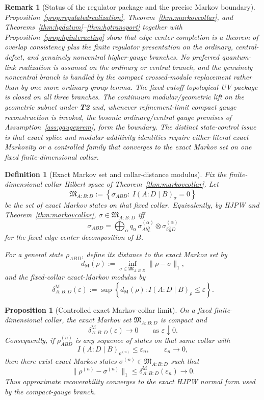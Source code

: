 \documentclass[11pt]{article}
\newtheorem{proposition}[theorem]{Proposition}
\newtheorem{definition}[theorem]{Definition}
\newtheorem{remark}[theorem]{Remark}
\begin{document}
\begin{remark}[Status of the regulator package and the precise Markov boundary]
Proposition~\ref{prop:regulatedrealization}, Theorem~\ref{thm:markovcollar}, and Theorems~\ref{thm:hgdatum}--\ref{thm:hgtransport} together with Proposition~\ref{prop:hginteracting} show that edge-center completion is a theorem of overlap consistency plus the finite regulator presentation on the ordinary, central-defect, and genuinely noncentral higher-gauge branches. No preferred quantum-link realization is assumed on the ordinary or central branch, and the genuinely noncentral branch is handled by the compact crossed-module replacement rather than by one more ordinary-group lemma. The fixed-cutoff topological UV package is closed on all three branches. The continuum modular/geometric lift on the geometric subnet under \textbf{T2} and, whenever refinement-limit compact gauge reconstruction is invoked, the bosonic ordinary/central gauge premises of Assumption~\ref{ass:gaugeprem}, form the boundary. The distinct state-control issue is that exact splice and modular-additivity identities require either literal exact Markovity or a controlled family that converges to the exact Markov set on one fixed finite-dimensional collar.
\end{remark}

\begin{definition}[Exact Markov set and collar-distance modulus]\label{def:markovmodulus}
Fix the finite-dimensional collar Hilbert space of Theorem~\ref{thm:markovcollar}. Let
\[
\mathfrak M_{A:B:D}
:=
\left\{
\sigma_{ABD}:\ I(A:D\mid B)_\sigma=0
\right\}
\]
be the set of exact Markov states on that fixed collar. Equivalently, by HJPW and Theorem~\ref{thm:markovcollar}, \(\sigma\in\mathfrak M_{A:B:D}\) iff
\[
\sigma_{ABD}
=
\bigoplus_\alpha q_\alpha\,
\sigma^{(\alpha)}_{A b_L^\alpha}\otimes \sigma^{(\alpha)}_{b_R^\alpha D}
\]
for the fixed edge-center decomposition of \(B\).

For a general state \(\rho_{ABD}\), define its distance to the exact Markov set by
\[
d_{\mathrm M}(\rho):=\inf_{\sigma\in\mathfrak M_{A:B:D}}\|\rho-\sigma\|_1,
\]
and the fixed-collar exact-Markov modulus by
\[
\delta^{\mathrm M}_{A:B:D}(\varepsilon)
:=
\sup\left\{
d_{\mathrm M}(\rho):
I(A:D\mid B)_\rho\le \varepsilon
\right\}.
\]
\end{definition}

\begin{proposition}[Controlled exact Markov-collar limit]\label{prop:controlledmarkov}
On a fixed finite-dimensional collar, the exact Markov set \(\mathfrak M_{A:B:D}\) is compact and
\[
\delta^{\mathrm M}_{A:B:D}(\varepsilon)\longrightarrow 0
\qquad
\text{as }\varepsilon\downarrow 0.
\]
Consequently, if \(\rho^{(n)}_{ABD}\) is any sequence of states on that same collar with
\[
I(A:D\mid B)_{\rho^{(n)}}\le \varepsilon_n,
\qquad
\varepsilon_n\to0,
\]
then there exist exact Markov states \(\sigma^{(n)}\in\mathfrak M_{A:B:D}\) such that
\[
\|\rho^{(n)}-\sigma^{(n)}\|_1
\le
\delta^{\mathrm M}_{A:B:D}(\varepsilon_n)
\longrightarrow 0.
\]
Thus approximate recoverability converges to the exact HJPW normal form used by the compact-gauge branch.
\end{proposition}
\end{document}
